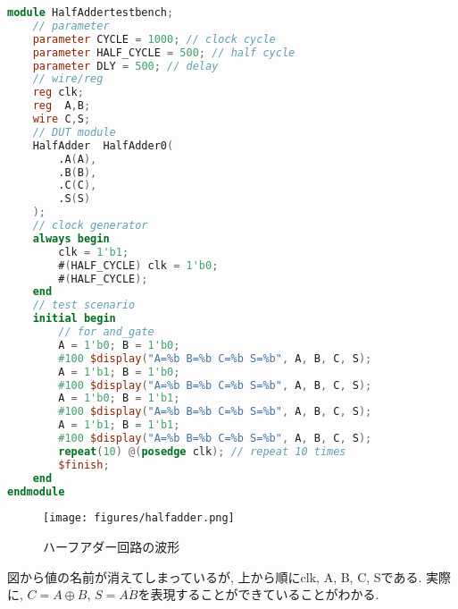 \documentclass[titlepage]{ltjsarticle}
\begin{document}
\begin{lstlisting}[caption=ハーフアダーテストベンチ,language=verilog]
    module HalfAddertestbench;
    // parameter
    parameter CYCLE = 1000; // clock cycle
    parameter HALF_CYCLE = 500; // half cycle
    parameter DLY = 500; // delay
    // wire/reg
    reg clk;
    reg  A,B;
    wire C,S;
    // DUT module
    HalfAdder  HalfAdder0(
        .A(A),
        .B(B),
        .C(C),
        .S(S)
    );    
    // clock generator
    always begin
        clk = 1'b1;
        #(HALF_CYCLE) clk = 1'b0;
        #(HALF_CYCLE);
    end
    // test scenario
    initial begin
        // for and_gate
        A = 1'b0; B = 1'b0;
        #100 $display("A=%b B=%b C=%b S=%b", A, B, C, S);
        A = 1'b1; B = 1'b0;
        #100 $display("A=%b B=%b C=%b S=%b", A, B, C, S); 
        A = 1'b0; B = 1'b1;
        #100 $display("A=%b B=%b C=%b S=%b", A, B, C, S);  
        A = 1'b1; B = 1'b1;
        #100 $display("A=%b B=%b C=%b S=%b", A, B, C, S);
        repeat(10) @(posedge clk); // repeat 10 times
        $finish;
    end
endmodule
\end{lstlisting}
\begin{figure}[H]
    \begin{center}
        \texttt{[image: figures/halfadder.png]}
        \caption{ハーフアダー回路の波形}
    \end{center}
\end{figure}
図から値の名前が消えてしまっているが, 上から順にclk, A, B, C, Sである. 実際に, $C=A\oplus B$, $S=A\dot B$を表現することができていることがわかる. 
\end{document}
